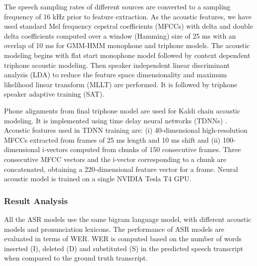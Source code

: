 \documentclass{ieeeaccess}
\begin{document}
The speech sampling rates of different sources are converted to a sampling frequency of 16 kHz prior to feature extraction.  As the acoustic features, we have used standard Mel frequency cepstral coefficients (MFCCs) with delta and double delta coefficients computed over a window (Hamming) size of 25 ms with an overlap of 10 ms for GMM-HMM monophone and triphone models. The acoustic modeling begins with flat start monophone model followed by context dependent triphone acoustic modeling. Then speaker independent linear discriminant analysis (LDA) to reduce the feature space dimensionality and maximum likelihood linear transform (MLLT) are performed. It is followed by triphone speaker adaptive training (SAT).


Phone alignments from final triphone model are used for Kaldi chain acoustic modeling. It is implemented using time delay neural networks (TDNNs) \cite{peddinti2015time}. Acoustic features used in TDNN training are: (i) 40-dimensional high-resolution MFCCs extracted from frames of 25 ms length and 10 ms shift and (ii) 100-dimensional i-vectors \cite{saon2013speaker} computed from chunks of 150 consecutive frames. Three consecutive MFCC vectors and the i-vector corresponding to a chunk are concatenated, obtaining a 220-dimensional feature vector for a frame. Neural acoustic model is trained on a single NVIDIA Tesla T4 GPU. 





\subsubsection*{Result Analysis }

All the ASR models use the same bigram language model, with different acoustic models and pronunciation lexicons. The performance of  ASR models are evaluated in terms of WER.  WER is computed based on the number of words inserted (I), deleted (D) and substituted (S) in the predicted speech transcript when compared to the ground truth transcript.
\end{document}
